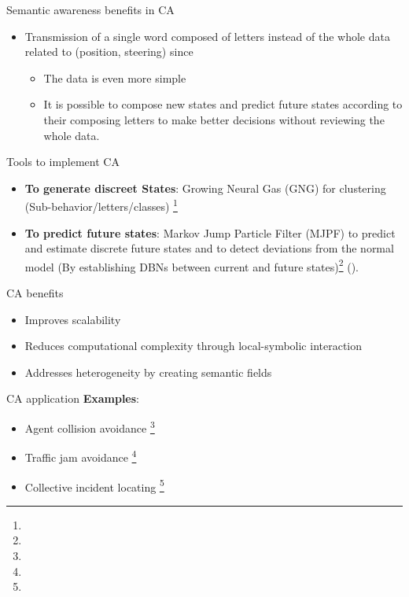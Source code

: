 \documentclass[unknownkeysallowed]{beamer}
\begin{document}
\begin{frame}{Semantic awareness benefits in CA}
	\begin{itemize}
		\item Transmission of a single word composed of letters instead of the whole data related to (position, steering) since 
		\begin{itemize}
			\item The data is even more simple
			\item It is possible to compose new states and predict future states according to their composing letters to make better decisions without reviewing the whole data.
		\end{itemize}
	\end{itemize}
\end{frame}

\begin{frame}{Tools to implement CA}
	\begin{itemize}
		\item  \textbf{To generate discreet States}: Growing Neural Gas (GNG) for clustering (Sub-behavior/letters/classes) \footnote{\tiny{}}
		\item \textbf{To predict future states}: Markov Jump Particle Filter (MJPF)  to predict and estimate discrete future states and to detect deviations from the normal model (By establishing DBNs between current and future states)\footnote{\tiny{}} (\textbf{\cite{kanapram-2019-self-awareness-in-intelligent-vehicles-experience-based-abnormality-detection}}).
	\end{itemize}
\end{frame}

\begin{frame}{CA benefits}
	\begin{itemize}
		\item Improves scalability
		\item Reduces computational complexity through local-symbolic interaction
		\item Addresses heterogeneity by creating semantic fields
	\end{itemize}
\end{frame}

\begin{frame}{CA application}
	\textbf{Examples}:
	\begin{itemize}
		\item Agent collision avoidance  \footnote{\tiny{}}
		\item Traffic jam avoidance \footnote{\tiny{}}
		\item Collective incident locating \footnote{\tiny{}}
	\end{itemize}
\end{frame}
\end{document}
